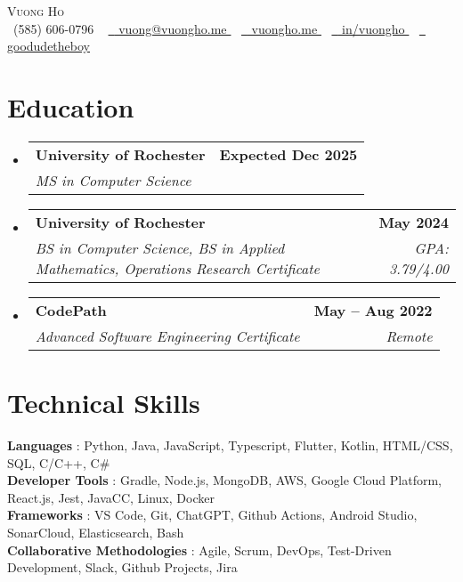\documentclass[letterpaper,11pt]{article}
\makeatletter
\newcommand{\resumeSubheading}[4]{
  \vspace{-2pt}\item
    \begin{tabular*}{1.0\textwidth}[t]{l@{\extracolsep{\fill}}r}
      \textbf{#1} & \textbf{\small #2} \\
      \textit{\small#3} & \textit{\small #4} \\
    \end{tabular*}\vspace{-7pt}
}
\newcommand{\resumeSubHeadingListStart}{\begin{itemize}[leftmargin=0.0in, label={}]}
\newcommand{\resumeSubHeadingListEnd}{\end{itemize}}
\makeatother
\begin{document}
\begin{center}
  {\Huge \scshape Vuong Ho} \\ \vspace{1pt}
  \small \raisebox{-0.1\height}
  \faPhone\ (585) 606-0796
  ~ \href{mailto:vuong@vuongho.me}{\raisebox{-0.2\height} \faEnvelope\ \underline{ vuong@vuongho.me }}
   ~ \href{ https://vuongho.me/ }{\raisebox{-0.2\height} \faHome\ \underline{ vuongho.me }} 
   ~ \href{ https://linkedin.com/in/vuongho/ }{\raisebox{-0.2\height} \faLinkedin\ \underline{ in/vuongho }} 
   ~ \href{https://github.com/{'link': 'https://github.com/goodudetheboy/', 'alias': 'goodudetheboy'}}{\raisebox{-0.2\height} \faGithub\ \underline{ goodudetheboy }} 
  \vspace{-8pt}
\end{center}


\section{Education}
  \resumeSubHeadingListStart
  
    \resumeSubheading
      { University of Rochester }{ Expected Dec 2025 }
      { MS in Computer Science } {  }
  
    \resumeSubheading
      { University of Rochester }{ May 2024 }
      { BS in Computer Science, BS in Applied Mathematics, Operations Research Certificate } { GPA: 3.79/4.00 }
  
    \resumeSubheading
      { CodePath }{ May – Aug 2022 }
      { Advanced Software Engineering Certificate } { Remote }
  
  \resumeSubHeadingListEnd

\section{Technical Skills}
 \begin{itemize}[leftmargin=0.15in, label={}]
    \small{\item{
      
        \textbf{ Languages }{: Python, Java, JavaScript, Typescript, Flutter, Kotlin, HTML/CSS, SQL, C/C++, C\#} \\
      
        \textbf{ Developer Tools }{: Gradle, Node.js, MongoDB, AWS, Google Cloud Platform, React.js, Jest, JavaCC, Linux, Docker} \\
      
        \textbf{ Frameworks }{: VS Code, Git, ChatGPT, Github Actions, Android Studio, SonarCloud, Elasticsearch, Bash} \\
      
        \textbf{ Collaborative Methodologies }{: Agile, Scrum, DevOps, Test-Driven Development, Slack, Github Projects, Jira} \\
      
    }}
 \end{itemize}
 \vspace{-16pt}
\end{document}
